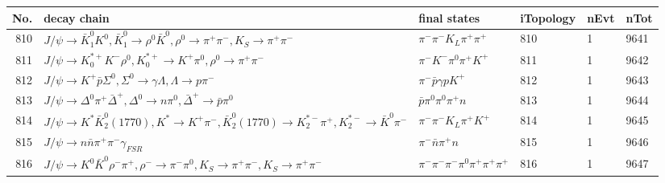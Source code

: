 \begin{table}[htbp] 
\begin{center}
\begin{small}
\begin{tabular}{rlllll}\hline\hline
 No. & decay chain & final states &  iTopology & nEvt & nTot \\\hline
810&$J/\psi       \rightarrow \bar{K}_1^{0} K^{0}          , \bar{K}_1^{0}  \rightarrow \rho^{0}      \bar{K}^{0}   , \rho^{0}       \rightarrow \pi^{+}        \pi^{-}        , K_{S}           \rightarrow \pi^{+}        \pi^{-}        $&$\pi^{-}        \pi^{-}        K_{L}          \pi^{+}        \pi^{+}        $&  810&    1& 9641\\
811&$J/\psi       \rightarrow K_{0}^{*+}     K^{-}          \rho^{0}      , K_{0}^{*+}      \rightarrow K^{+}          \pi^{0}        , \rho^{0}       \rightarrow \pi^{+}        \pi^{-}        $&$\pi^{-}        K^{-}          \pi^{0}        \pi^{+}        K^{+}          $&  811&    1& 9642\\
812&$J/\psi       \rightarrow K^{+}          \bar{p}          \Sigma^0          , \Sigma^0           \rightarrow \gamma       \Lambda           , \Lambda            \rightarrow p                 \pi^{-}        $&$\pi^{-}        \bar{p}          \gamma       p                 K^{+}          $&  812&    1& 9643\\
813&$J/\psi       \rightarrow \Delta^0          \pi^{+}        \bar{\Delta}^+   , \Delta^0           \rightarrow n                 \pi^{0}        , \bar{\Delta}^+    \rightarrow \bar{p}          \pi^{0}        $&$\bar{p}          \pi^{0}        \pi^{0}        \pi^{+}        n                 $&  813&    1& 9644\\
814&$J/\psi       \rightarrow K^{*}          \bar{K}_2^0(1770), K^{*}           \rightarrow K^{+}          \pi^{-}        , \bar{K}_2^0(1770) \rightarrow K_2^{*-}       \pi^{+}        , K_2^{*-}        \rightarrow \bar{K}^{0}   \pi^{-}        $&$\pi^{-}        \pi^{-}        K_{L}          \pi^{+}        K^{+}          $&  814&    1& 9645\\
815&$J/\psi       \rightarrow n                 \bar{n}          \pi^{+}        \pi^{-}        \gamma_{FSR} $&$\pi^{-}        \bar{n}          \pi^{+}        n                 $&  815&    1& 9646\\
816&$J/\psi       \rightarrow K^{0}          \bar{K}^{0}   \rho^{-}      \pi^{+}        , \rho^{-}       \rightarrow \pi^{-}        \pi^{0}        , K_{S}           \rightarrow \pi^{+}        \pi^{-}        , K_{S}           \rightarrow \pi^{+}        \pi^{-}        $&$\pi^{-}        \pi^{-}        \pi^{-}        \pi^{0}        \pi^{+}        \pi^{+}        \pi^{+}        $&  816&    1& 9647\\

\end{tabular}
\end{small}
\end{center}
\end{table}

